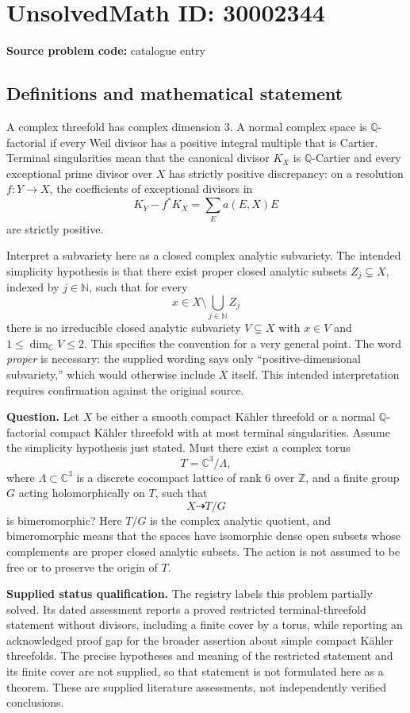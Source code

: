 \documentclass[11pt]{article}
\newcommand{\N}{\mathbb{N}}
\newcommand{\Z}{\mathbb{Z}}
\newcommand{\Q}{\mathbb{Q}}
\newcommand{\C}{\mathbb{C}}
\begin{document}
\section*{UnsolvedMath ID: 30002344}
\textbf{Source problem code:} catalogue entry
\subsection{Definitions and mathematical statement}
A complex threefold has complex dimension \(3\). A normal complex space is \(\Q\)-factorial if every Weil divisor has a positive integral multiple that is Cartier. Terminal singularities mean that the canonical divisor \(K_X\) is \(\Q\)-Cartier and every exceptional prime divisor over \(X\) has strictly positive discrepancy: on a resolution \(f\colon Y\to X\), the coefficients of exceptional divisors in
\[
K_Y-f^*K_X=\sum_E a(E,X)E
\]
are strictly positive.

Interpret a subvariety here as a closed complex analytic subvariety. The intended simplicity hypothesis is that there exist proper closed analytic subsets \(Z_j\subsetneq X\), indexed by \(j\in\N\), such that for every
\[
x\in X\setminus\bigcup_{j\in\N}Z_j
\]
there is no irreducible closed analytic subvariety \(V\subsetneq X\) with \(x\in V\) and \(1\leq\dim_{\C}V\leq2\). This specifies the convention for a very general point. The word \emph{proper} is necessary: the supplied wording says only ``positive-dimensional subvariety,'' which would otherwise include \(X\) itself. This intended interpretation requires confirmation against the original source.

\textbf{Question.} Let \(X\) be either a smooth compact K\"ahler threefold or a normal \(\Q\)-factorial compact K\"ahler threefold with at most terminal singularities. Assume the simplicity hypothesis just stated. Must there exist a complex torus
\[
T=\C^3/\Lambda,
\]
where \(\Lambda\subset\C^3\) is a discrete cocompact lattice of rank \(6\) over \(\Z\), and a finite group \(G\) acting holomorphically on \(T\), such that
\[
X\dashrightarrow T/G
\]
is bimeromorphic? Here \(T/G\) is the complex analytic quotient, and bimeromorphic means that the spaces have isomorphic dense open subsets whose complements are proper closed analytic subsets. The action is not assumed to be free or to preserve the origin of \(T\).

\textbf{Supplied status qualification.} The registry labels this problem partially solved. Its dated assessment reports a proved restricted terminal-threefold statement without divisors, including a finite cover by a torus, while reporting an acknowledged proof gap for the broader assertion about simple compact K\"ahler threefolds. The precise hypotheses and meaning of the restricted statement and its finite cover are not supplied, so that statement is not formulated here as a theorem. These are supplied literature assessments, not independently verified conclusions.
\end{document}
